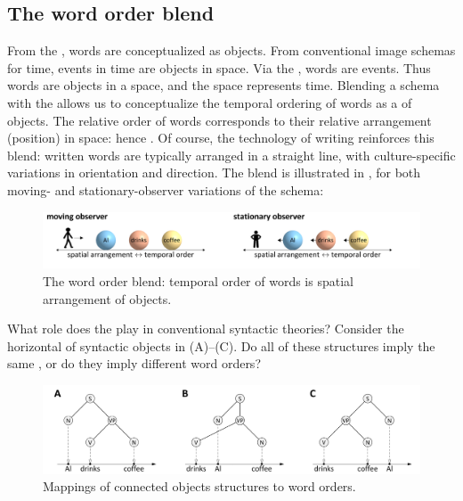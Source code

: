 \subsection{The word order blend}

From the , words are conceptualized as objects. From conventional image schemas for time, events in time are objects in space. Via the , words are events. Thus words are objects in a space, and the space represents time. Blending a  schema with the  allows us to conceptualize the temporal ordering of words as a  of objects. The relative order of words corresponds to their relative arrangement (position) in space: hence {}. Of course, the technology of writing reinforces this blend: written words are typically arranged in a straight line, with culture-specific variations in orientation and direction. The blend is illustrated in {}, for both moving- and stationary-observer variations of the schema:

  
\begin{figure}
\includegraphics[width=\textwidth]{figures/Tilsen-img39.png}
\caption{The word order blend: temporal order of words is spatial arrangement of objects.}
\label{fig:3:11}
\end{figure}
 

  What role does the  play in conventional syntactic theories? Consider the horizontal  of syntactic objects in {}(A)--(C). Do all of these structures imply the same , or do they imply different word orders?

  
\begin{figure}
\includegraphics[width=\textwidth]{figures/Tilsen-img40.png}
\caption{Mappings of connected objects structures to word orders.}
\label{fig:3:12}
\end{figure}
 

